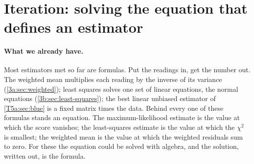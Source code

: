 \providecommand{\TFiveBKfRunDiff}{}\renewcommand{\TFiveBKfRunDiff}{4.663\times10^{-15}}
\providecommand{\TFiveBKfT}{}\renewcommand{\TFiveBKfT}{5000}
\providecommand{\TFiveBKfR}{}\renewcommand{\TFiveBKfR}{200}
\providecommand{\TFiveBKfSq}{}\renewcommand{\TFiveBKfSq}{0.002}
\providecommand{\TFiveBKfSr}{}\renewcommand{\TFiveBKfSr}{0.05}
\providecommand{\TFiveBKfBurn}{}\renewcommand{\TFiveBKfBurn}{500}
\providecommand{\TFiveBKfRms}{}\renewcommand{\TFiveBKfRms}{0.009867}
\providecommand{\TFiveBKfPss}{}\renewcommand{\TFiveBKfPss}{0.009901}
\providecommand{\TFiveBKfKss}{}\renewcommand{\TFiveBKfKss}{0.03921}
\providecommand{\TFiveBKfMem}{}\renewcommand{\TFiveBKfMem}{25.5}
\providecommand{\TFiveBKfRmsRun}{}\renewcommand{\TFiveBKfRmsRun}{0.06061}
\providecommand{\TFiveBKfWbest}{}\renewcommand{\TFiveBKfWbest}{42}
\providecommand{\TFiveBKfRmsWbest}{}\renewcommand{\TFiveBKfRmsWbest}{0.01064}
\providecommand{\TFiveBKfWtheory}{}\renewcommand{\TFiveBKfWtheory}{43.3}
\providecommand{\TFiveBKfRmsWtheory}{}\renewcommand{\TFiveBKfRmsWtheory}{0.01075}
\providecommand{\TFiveBKfWinFrac}{}\renewcommand{\TFiveBKfWinFrac}{100}
\providecommand{\TFiveBKfGain}{}\renewcommand{\TFiveBKfGain}{7.238}
\providecommand{\TFiveBKfRmsQtenth}{}\renewcommand{\TFiveBKfRmsQtenth}{0.01308}
\providecommand{\TFiveBKfRmsQten}{}\renewcommand{\TFiveBKfRmsQten}{0.01308}
\providecommand{\TFiveBKfRmsQhundredth}{}\renewcommand{\TFiveBKfRmsQhundredth}{0.0225}
\providecommand{\TFiveBKfRmsQhundred}{}\renewcommand{\TFiveBKfRmsQhundred}{0.02219}
 
\section{Iteration: solving the equation that defines an estimator}
\label{T5b:sec:iterative}

\paragraph{What we already have.}
Most estimators met so far are formulas. Put the readings in, get the
number out. The weighted mean multiplies each reading by the inverse of its
variance (\cref{3a:sec:weighted}); least squares solves one set of linear
equations, the normal equations (\cref{3b:sec:least-squares}); the best
linear unbiased estimator of \cref{T5a:sec:blue} is a fixed matrix times
the data. Behind every one of these formulas stands an equation. The
maximum-likelihood estimate is the value at which the score vanishes; the
least-squares estimate is the value at which the $\chi^2$ is smallest; the
weighted mean is the value at which the weighted residuals sum to zero.
For these the equation could be solved with algebra, and the solution,
written out, is the formula.

